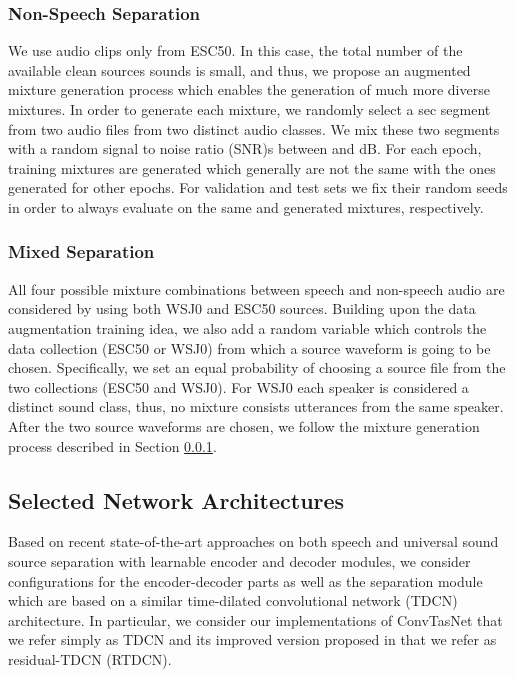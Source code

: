 \documentclass{article}
\begin{document}
\subsubsection{Non-Speech Separation} \label{sec:Framework:SeparationTasks:ESC50}
We use audio clips only from ESC50. In this case, the total number of the available clean sources sounds is small, and thus, we propose an augmented mixture generation process which enables the generation of much more diverse mixtures. In order to generate each mixture, we randomly select a sec segment from two audio files from two distinct audio classes. We mix these two segments with a random signal to noise ratio (SNR)s between  and dB. For each epoch,  training mixtures are generated which generally are not the same with the ones generated for other epochs. For validation and test sets we fix their random seeds in order to always evaluate on the same  and  generated mixtures, respectively.
\subsubsection{Mixed Separation} \label{sec:Framework:SeparationTasks:WSJESC50}
All four possible mixture combinations between speech and non-speech audio are considered by using both WSJ0 and ESC50 sources. Building upon the data augmentation training idea, we also add a random variable which controls the data collection (ESC50 or WSJ0) from which a source waveform is going to be chosen. Specifically, we set an equal probability of choosing a source file from the two collections (ESC50 and WSJ0). For WSJ0 each speaker is considered a distinct sound class, thus, no mixture consists utterances from the same speaker. After the two source waveforms are chosen, we follow the mixture generation process described in Section \ref{sec:Framework:SeparationTasks:ESC50}.  
\subsection{Selected Network Architectures}
Based on recent state-of-the-art approaches on both speech and universal sound source separation with learnable encoder and decoder modules, we consider configurations for the encoder-decoder parts as well as the separation module which are based on a similar time-dilated convolutional network (TDCN) architecture. In particular, we consider our implementations of ConvTasNet \cite{luo2019convTasNet} that we refer simply as TDCN and its improved version proposed in \cite{kavalerov2019universal} that we refer as residual-TDCN (RTDCN). 
\end{document}
